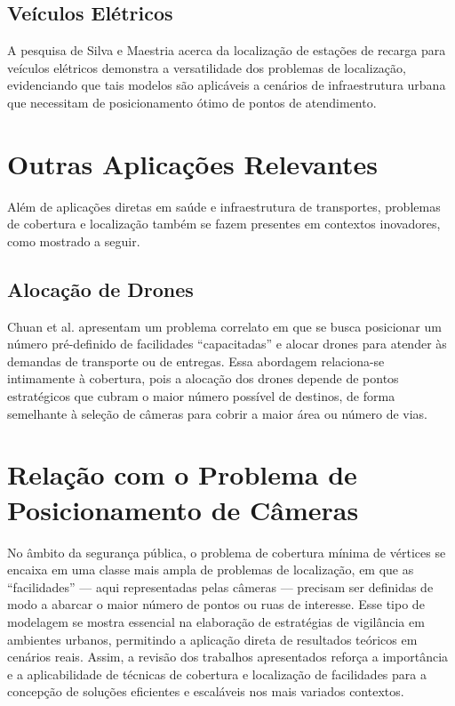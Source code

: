 \documentclass[12pt, a4paper]{report}
\begin{document}
\subsection{Veículos Elétricos}
A pesquisa de Silva e Maestria \cite{Silva2019} acerca da localização de estações de recarga para veículos elétricos demonstra a versatilidade dos problemas de localização, evidenciando que tais modelos são aplicáveis a cenários de infraestrutura urbana que necessitam de posicionamento ótimo de pontos de atendimento.

\section{Outras Aplicações Relevantes}
Além de aplicações diretas em saúde e infraestrutura de transportes, problemas de cobertura e localização também se fazem presentes em contextos inovadores, como mostrado a seguir.

\subsection{Alocação de Drones}
Chuan et al. \cite{Chuan2019} apresentam um problema correlato em que se busca posicionar um número pré-definido de facilidades “capacitadas” e alocar drones para atender às demandas de transporte ou de entregas. Essa abordagem relaciona-se intimamente à cobertura, pois a alocação dos drones depende de pontos estratégicos que cubram o maior número possível de destinos, de forma semelhante à seleção de câmeras para cobrir a maior área ou número de vias.

\section{Relação com o Problema de Posicionamento de Câmeras}
No âmbito da segurança pública, o problema de cobertura mínima de vértices se encaixa em uma classe mais ampla de problemas de localização, em que as “facilidades” — aqui representadas pelas câmeras — precisam ser definidas de modo a abarcar o maior número de pontos ou ruas de interesse. Esse tipo de modelagem se mostra essencial na elaboração de estratégias de vigilância em ambientes urbanos, permitindo a aplicação direta de resultados teóricos em cenários reais. Assim, a revisão dos trabalhos apresentados reforça a importância e a aplicabilidade de técnicas de cobertura e localização de facilidades para a concepção de soluções eficientes e escaláveis nos mais variados contextos. 
\end{document}
